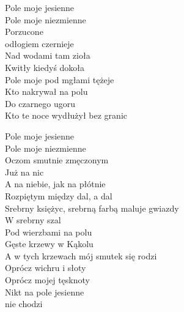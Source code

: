 \begin{text}
    Pole moje jesienne\\
    Pole moje niezmienne\\
    Porzucone\\
    odłogiem czernieje\\
    Nad wodami tam zioła\\
    Kwitły kiedyś dokoła\\
    Pole moje pod mgłami tężeje\\
    Kto nakrywał na polu\\
    Do czarnego ugoru\\
    Kto te noce wydłużył bez granic

    Pole moje jesienne\\
    Pole moje niezmienne\\
    Oczom smutnie zmęczonym\\
    Już na nic\\
    A na niebie, jak na płótnie\\
    Rozpiętym między dal, a dal\\
    Srebrny księżyc, srebrną farbą maluje gwiazdy\\
    W srebrny szal\\
    Pod wierzbami na polu\\
    Gęste krzewy w Kąkolu\\
    A w tych krzewach mój smutek się rodzi\\
    Oprócz wichru i słoty\\
    Oprócz mojej tęsknoty\\
    Nikt na pole jesienne\\
    nie chodzi
\end{text}
\begin{chord}

\end{chord}